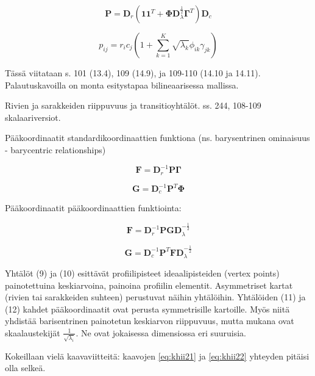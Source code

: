 \documentclass[finnish,]{article}
\begin{document}
\begin{equation}
\boldsymbol{P} = \boldsymbol{D}_{r} \left( \boldsymbol{1}\boldsymbol{1}^{T} + \boldsymbol{\Phi}\boldsymbol{D}_{\lambda}^{\frac {1}{2}}\boldsymbol{\Gamma}^{T}\right)\boldsymbol{D}_{c}
\end{equation}

\begin{equation}
p_ {ij}= r_{i}c_{j} \left(1 + \sum_{k=1}^{K} \sqrt{\lambda_{k}} \phi_{ik} \gamma_{jk} \right)
\end{equation}

Tässä viitataan s. 101 (13.4), 109 (14.9), ja 109-110 (14.10 ja 14.11).
Palautuskavoilla on monta esitystapaa bilineaarisessa mallissa.

Rivien ja sarakkeiden riippuvuus ja transitioyhtälöt. ss. 244, 108-109
skalaariversiot.

Pääkoordinaatit standardikoordinaattien funktiona (ns. barysentrinen
ominaisuus - barycentric relationships)

\begin{equation}
\boldsymbol{F} = \boldsymbol{D}_{r}^{-1} \boldsymbol{P}\boldsymbol{\Gamma}
\end{equation}

\begin{equation}
\boldsymbol{G} = \boldsymbol{D}_{c}^{-1} \boldsymbol{P}^{T}\boldsymbol{\Phi}
\end{equation}

Pääkoordinaatit pääkoordinaattien funktiointa:

\begin{equation}
\boldsymbol{F} = \boldsymbol{D}_{r}^{-1} \boldsymbol{P}\boldsymbol{G}\boldsymbol{D}_{\lambda}^{-\frac{1}{2}}
\end{equation}

\begin{equation}
\boldsymbol{G} = \boldsymbol{D}_{c}^{-1} \boldsymbol{P}^{T}\boldsymbol{F}\boldsymbol{D}_{\lambda}^{-\frac{1}{2}}
\end{equation}

Yhtälöt (9) ja (10) esittävät profiilipisteet ideaalipisteiden (vertex
points) painotettuina keskiarvoina, painoina profiilin elementit.
Asymmetriset kartat (rivien tai sarakkeiden suhteen) perustuvat näihin
yhtälöihin. Yhtälöiden (11) ja (12) kahdet pääkoordinaatit ovat perusta
symmetrisille kartoille. Myös niitä yhdistää barisentrinen painotetun
keskiarvon riippuvuus, mutta mukana ovat skaalaustekijät
\(\frac{1}{\sqrt{\lambda_{i}}}\). Ne ovat jokaisessa dimensiossa eri
suuruisia.

Kokeillaan vielä kaavaviitteitä: kaavojen \eqref{eq:khii21} ja
\eqref{eq:khii22} yhteyden pitäisi olla selkeä.
\end{document}
